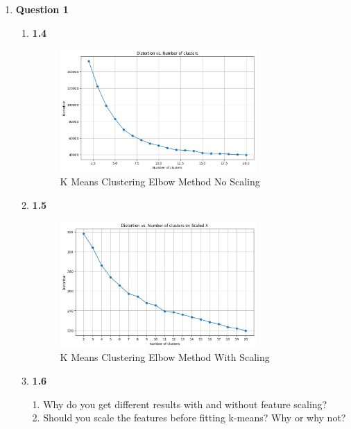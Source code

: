 \documentclass[12pt]{article}
\begin{document}
\begin{enumerate}
  \item \textbf{Question 1}
  \begin{enumerate}
    \item \textbf{1.4}
      \begin{figure}[H]
        \centering 
        \includegraphics[width=0.75\textwidth]{1_4.png}
        \caption{K Means Clustering Elbow Method No Scaling}
      \end{figure}
    \item \textbf{1.5}
    
    \begin{figure}[H]
      \centering 
      \includegraphics[width=0.75\textwidth]{1_5.png}
      \caption{K Means Clustering Elbow Method With Scaling}
    \end{figure}

    \item \textbf{1.6}
    
    1. Why do you get different results with and without feature scaling? \\ 


    2. Should you scale the features before fitting k-means? Why or why not? \\
  

  \end{enumerate}


\end{enumerate}
\end{document}
